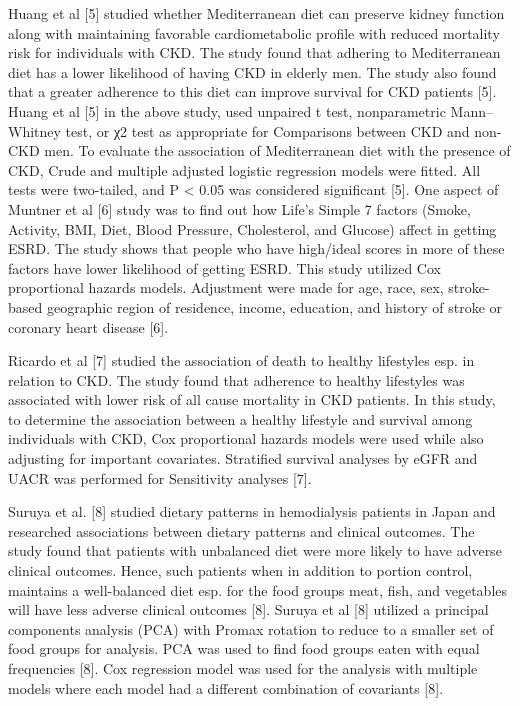 Huang et al [5] studied whether Mediterranean diet can preserve kidney function along with maintaining favorable cardiometabolic profile with reduced mortality risk for individuals with CKD. The study found that adhering to Mediterranean diet has a lower likelihood of
having CKD in elderly men. The study also found that a greater adherence to this diet can improve survival for CKD patients [5]. Huang et al [5] in the above study, used unpaired t test, nonparametric Mann–Whitney test, or χ2 test as appropriate for Comparisons between CKD
and non-CKD men. To evaluate the association of Mediterranean diet with the presence of CKD, Crude and multiple adjusted logistic regression models were fitted. All tests were two-tailed, and P < 0.05 was considered significant [5]. One aspect of Muntner et al [6] study
was to find out how Life’s Simple 7 factors (Smoke, Activity, BMI, Diet, Blood Pressure, Cholesterol, and Glucose) affect in getting ESRD. The study shows that people who have high/ideal scores in more of these factors have lower likelihood of getting ESRD. This study
utilized Cox proportional hazards models. Adjustment were made for age, race, sex, stroke-based geographic region of residence, income, education, and history of stroke or coronary heart disease [6].

Ricardo et al [7] studied the association of death to healthy lifestyles esp. in relation to CKD. The study found that adherence to healthy lifestyles was associated with lower risk of all cause mortality in CKD patients. In this study, to determine the association between
a healthy lifestyle and survival among individuals with CKD, Cox proportional hazards models were used while also adjusting for important covariates. Stratified survival analyses by eGFR and UACR was performed for Sensitivity analyses [7].

Suruya et al. [8] studied dietary patterns in hemodialysis patients in Japan and researched associations between dietary patterns and clinical outcomes. The study found that patients with unbalanced diet were more likely to have adverse clinical outcomes. Hence, such
patients when in addition to portion control, maintains a well-balanced diet esp. for the food groups meat, fish, and vegetables will have less adverse clinical outcomes [8]. Suruya et al [8] utilized a principal components analysis (PCA) with Promax rotation to reduce to
a smaller set of food groups for analysis. PCA was used to find food groups eaten with equal frequencies [8]. Cox regression model was used for the analysis with multiple models where each model had a different combination of covariants [8].

